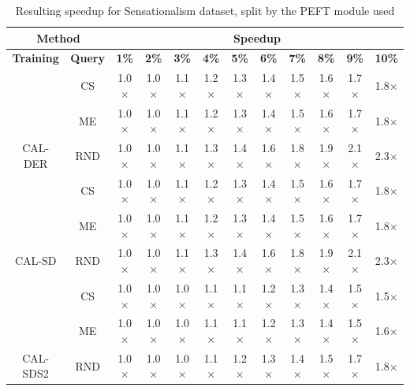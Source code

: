 \begin{table}[htbp]
\begin{subtable}{\linewidth}
\begin{tabular}{c|c|cccccccccc}
\toprule
\multicolumn{2}{c|}{\textbf{Method}} & \multicolumn{10}{c}{\textbf{Speedup}} \\
\midrule
\textbf{Training} & \textbf{Query} & \textbf{1\%} & \textbf{2\%} & \textbf{3\%} & \textbf{4\%} & \textbf{5\%} & \textbf{6\%} & \textbf{7\%} & \textbf{8\%} & \textbf{9\%} & \textbf{10\%}\\
\midrule
 & CS & 1.0$\times$ & 1.0$\times$ & 1.1$\times$ & 1.2$\times$ & 1.3$\times$ & 1.4$\times$ & 1.5$\times$ & 1.6$\times$ & 1.7$\times$ & 1.8$\times$\\

 & ME & 1.0$\times$ & 1.0$\times$ & 1.1$\times$ & 1.2$\times$ & 1.3$\times$ & 1.4$\times$ & 1.5$\times$ & 1.6$\times$ & 1.7$\times$ & 1.8$\times$\\

\multirow{-3}{*}{\raggedright\arraybackslash CAL-DER} & RND & 1.0$\times$ & 1.0$\times$ & 1.1$\times$ & 1.3$\times$ & 1.4$\times$ & 1.6$\times$ & 1.8$\times$ & 1.9$\times$ & 2.1$\times$ & 2.3$\times$\\
\midrule
 & CS & 1.0$\times$ & 1.0$\times$ & 1.1$\times$ & 1.2$\times$ & 1.3$\times$ & 1.4$\times$ & 1.5$\times$ & 1.6$\times$ & 1.7$\times$ & 1.8$\times$\\

 & ME & 1.0$\times$ & 1.0$\times$ & 1.1$\times$ & 1.2$\times$ & 1.3$\times$ & 1.4$\times$ & 1.5$\times$ & 1.6$\times$ & 1.7$\times$ & 1.8$\times$\\

\multirow{-3}{*}{\raggedright\arraybackslash CAL-SD} & RND & 1.0$\times$ & 1.0$\times$ & 1.1$\times$ & 1.3$\times$ & 1.4$\times$ & 1.6$\times$ & 1.8$\times$ & 1.9$\times$ & 2.1$\times$ & 2.3$\times$\\
\midrule
 & CS & 1.0$\times$ & 1.0$\times$ & 1.0$\times$ & 1.1$\times$ & 1.1$\times$ & 1.2$\times$ & 1.3$\times$ & 1.4$\times$ & 1.5$\times$ & 1.5$\times$\\

 & ME & 1.0$\times$ & 1.0$\times$ & 1.0$\times$ & 1.1$\times$ & 1.1$\times$ & 1.2$\times$ & 1.3$\times$ & 1.4$\times$ & 1.5$\times$ & 1.6$\times$\\

\multirow{-3}{*}{\raggedright\arraybackslash CAL-SDS2} & RND & 1.0$\times$ & 1.0$\times$ & 1.0$\times$ & 1.1$\times$ & 1.2$\times$ & 1.3$\times$ & 1.4$\times$ & 1.5$\times$ & 1.7$\times$ & 1.8$\times$\\
\bottomrule
\end{tabular}
\end{subtable}
\caption{Resulting speedup for Sensationalism dataset, split by the PEFT module used}
\label{tab:speedup_short_sensation_10}
\end{table}
